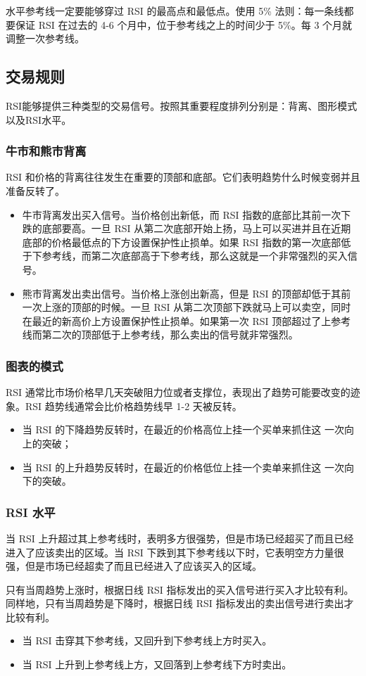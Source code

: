 水平参考线一定要能够穿过 RSI 的最高点和最低点。使用 5\% 法则：每一条线都要保证 RSI 在过去的 4-6 个月中，位于参考线之上的时间少于 5\%。每 3 个月就调整一次参考线。
\subsection*{交易规则}
RSI能够提供三种类型的交易信号。按照其重要程度排列分别是：背离、图形模式以及RSI水平。

\subsubsection*{牛市和熊市背离}

RSI 和价格的背离往往发生在重要的顶部和底部。它们表明趋势什么时候变弱并且准备反转了。
\begin{itemize}
    \item 牛市背离发出买入信号。当价格创出新低，而 RSI 指数的底部比其前一次下跌的底部要高。一旦 RSI 从第二次底部开始上扬，马上可以买进并且在近期底部的价格最低点的下方设置保护性止损单。如果 RSI 指数的第一次底部低于下参考线，而第二次底部高于下参考线，那么这就是一个非常强烈的买入信号。
    \item 熊市背离发出卖出信号。当价格上涨创出新高，但是 RSI 的顶部却低于其前一次上涨的顶部的时候。一旦 RSI 从第二次顶部下跌就马上可以卖空，同时在最近的新高价上方设置保护性止损单。如果第一次 RSI 顶部超过了上参考线而第二次的顶部低于上参考线，那么卖出的信号就非常强烈。
\end{itemize}
\subsubsection*{图表的模式}
RSI 通常比市场价格早几天突破阻力位或者支撑位，表现出了趋势可能要改变的迹象。RSI 趋势线通常会比价格趋势线早 1-2 天被反转。
\begin{itemize}
    \item 当 RSI 的下降趋势反转时，在最近的价格高位上挂一个买单来抓住这
          一次向上的突破；
    \item 当 RSI 的上升趋势反转时，在最近的价格低位上挂一个卖单来抓住这
          一次向下的突破。
\end{itemize}
\subsubsection*{RSI 水平}
当 RSI 上升超过其上参考线时，表明多方很强势，但是市场已经超买了而且已经进入了应该卖出的区域。当 RSI 下跌到其下参考线以下时，它表明空方力量很强，但是市场已经超卖了而且已经进入了应该买入的区域。

只有当周趋势上涨时，根据日线 RSI 指标发出的买入信号进行买入才比较有利。同样地，只有当周趋势是下降时，根据日线 RSI 指标发出的卖出信号进行卖出才比较有利。
\begin{itemize}
    \item 当 RSI 击穿其下参考线，又回升到下参考线上方时买入。
    \item 当 RSI 上升到上参考线上方，又回落到上参考线下方时卖出。
\end{itemize}
